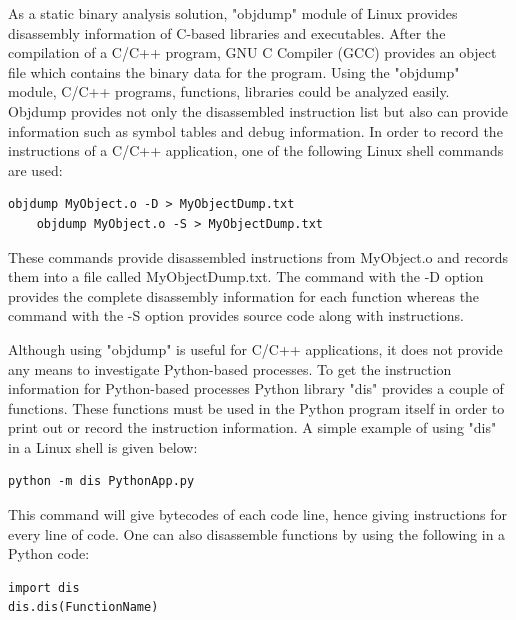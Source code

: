 As a static binary analysis solution, "objdump" \cite{objdump} module of Linux provides disassembly information of C-based libraries and executables. After the compilation of a C/C++ program, GNU C Compiler (GCC) provides an object file which contains the binary data for the program. Using the "objdump" module, C/C++ programs, functions, libraries could be analyzed easily. Objdump provides not only the disassembled instruction list but also can provide information such as symbol tables and debug information. In order to record the instructions of a C/C++ application, one of the following Linux shell commands are used:
\begin{lstlisting}[style=bash]
	objdump MyObject.o -D > MyObjectDump.txt
	objdump MyObject.o -S > MyObjectDump.txt
\end{lstlisting}
These commands provide disassembled instructions from MyObject.o and records them into a file called MyObjectDump.txt. The command with the -D option provides the complete disassembly information for each function whereas the command with the -S option provides source code along with instructions. 

Although using "objdump" is useful for C/C++ applications, it does not provide any means to investigate Python-based processes. To get the instruction information for Python-based processes Python library "dis" \cite{dis} provides a couple of functions. These functions must be used in the Python program itself in order to print out or record the instruction information. A simple example of using "dis" in a Linux shell is given below:
\begin{lstlisting}[style=bash]
python -m dis PythonApp.py
\end{lstlisting}
This command will give bytecodes of each code line, hence giving instructions for every line of code. One can also disassemble functions by using the following in a Python code:
\begin{lstlisting}[style=bash]
import dis
dis.dis(FunctionName)
\end{lstlisting}
 
